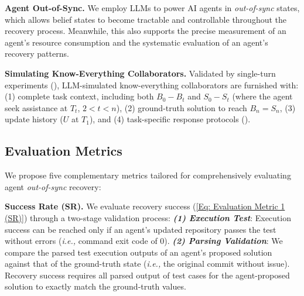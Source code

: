 \textbf{Agent Out-of-Sync.} We employ LLMs to power AI agents in \textit{out-of-sync} states, which allows belief states to become tractable and controllable throughout the recovery process. Meanwhile, this also supports the precise measurement of an agent's resource consumption and the systematic evaluation of an agent's recovery patterns.

\textbf{Simulating Know-Everything Collaborators.} 
Validated by single-turn experiments (), LLM-simulated know-everything collaborators are furnished with: (1) complete task context, including both $B_0-B_t$ and $S_0-S_t$ (where the agent seek assistance at $T_t$, $2<t<n$), (2) ground-truth solution to reach $B_n=S_n$, (3) update history ($U$ at $T_1$), and (4) task-specific response protocols ().

















\subsection{Evaluation Metrics}
\label{Section: Evaluation Metrics}
We propose five complementary metrics tailored for comprehensively evaluating agent \textit{out-of-sync} recovery:

\textbf{Success Rate (SR).}
We evaluate recovery success (\eqref{Eq: Evaluation Metric 1 (SR)}) through a two-stage validation process: \textbf{\textit{(1) Execution Test}}: Execution success can be reached only if an agent's updated repository passes the test without errors (\textit{i.e.,} command exit code of 0). 
\textbf{\textit{(2) Parsing Validation}}: We compare the parsed test execution outputs of an agent's proposed solution against that of the ground-truth state (\textit{i.e.,} the original commit without issue). Recovery success requires all parsed output of test cases for the agent-proposed solution to exactly match the ground-truth values.

